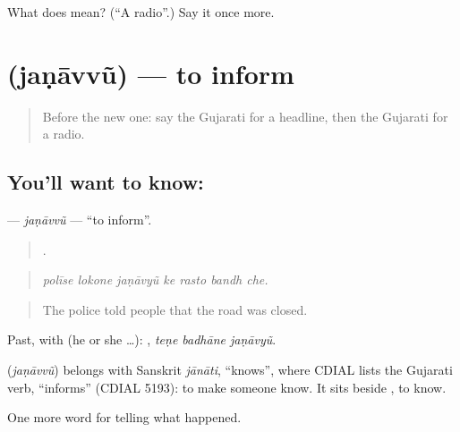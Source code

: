 \begin{tcolorbox}[breakable,colback=teal!4,colframe=teal!35!black,title={Before you move on}]
What does  mean? (\textquotedblleft{}A radio\textquotedblright{}.) Say it once more.
\end{tcolorbox}
\section[\texorpdfstring{\gu{જણાવવું} (jaṇāvvũ)}{જણાવવું (jaṇāvvũ)}]{ (jaṇāvvũ) — to inform}

\label{lesson:GU-C311-janavvu}



\begin{quote}
Before the new one: say the Gujarati for a headline, then the Gujarati for a radio.
\end{quote}

\subsection*{You'll want to know: }
\textbf{} — \emph{jaṇāvvũ} — \textquotedblleft{}to inform\textquotedblright{}.

\begin{quote}
      .
\end{quote}

\begin{quote}
\emph{polīse lokone jaṇāvyũ ke rasto bandh che.}
\end{quote}

\begin{quote}
The police told people that the road was closed.
\end{quote}

Past, with  (he or she …):   , \emph{teṇe badhāne jaṇāvyũ}.

\begin{cousinweb}
\textbf{} (\emph{jaṇāvvũ}) belongs with Sanskrit \emph{jānāti}, \textquotedblleft{}knows\textquotedblright{}, where CDIAL lists the Gujarati verb, \textquotedblleft{}informs\textquotedblright{} (CDIAL 5193): to make someone know. It sits beside \textbf{}, to know.
\end{cousinweb}

\begin{grammarlens}[title={What you've built}]
One more word for telling what happened.
\end{grammarlens}

